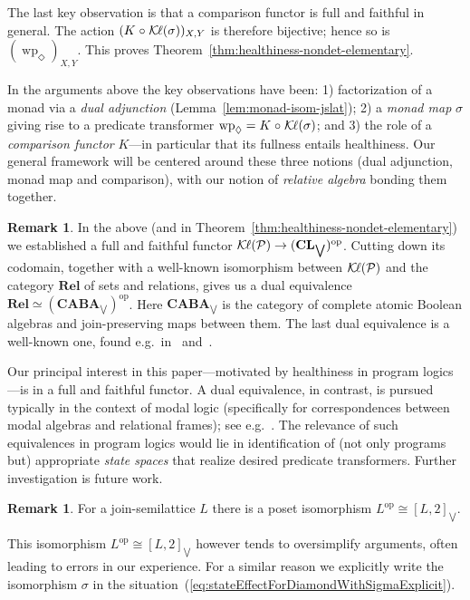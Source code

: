 \documentclass[9pt, preprint]{sigplanconf}
\theoremstyle{theorem}
\theoremstyle{definition}
\newtheorem{remark}[theorem]{Remark}
\newcommand{\pow}{\mathcal{P}}
\newcommand{\place}{{-}}
\newcommand{\op}{\mathrm{op}}
\newcommand{\Rel}{\mathbf{Rel}}
\newcommand{\CL}{\mathbf{CL}}
\newcommand{\Kl}{\mathcal{K}{\kern-.2ex}\ell}
\newcommand{\biglor}{\bigvee}
\newif\ifignore \ignorefalse
\newcommand{\auxproof}[1]{
\ifignore\mbox{}\newline
\textbf{BEGIN: AUX-PROOF} \dotfill\newline
{#1}\mbox{}\newline
\textbf{END: AUX-PROOF}\dotfill\newline
\fi}
\newcommand{\co}{\mathrel{\circ}}
\newcommand{\wpre}{\mathop{\mathrm{wp}}\nolimits}
\begin{document}
The last key observation is that
 a comparison functor is full and faithful
in general.   The action $(K\co \Kl(\sigma))_{X,Y}$ is therefore bijective;
 hence so is $(\wpre_{\Diamond})_{X,Y}$.
This proves Theorem~\ref{thm:healthiness-nondet-elementary}.


In the arguments above the key observations have been: 1) factorization of
a monad via a \emph{dual adjunction} (Lemma~\ref{lem:monad-isom-jslat});
2) a \emph{monad map} $\sigma$ giving rise to a predicate transformer
$\wpre_{\Diamond}=K\co\Kl(\sigma)$; and 3) the role of a \emph{comparison
functor} $K$---in particular that its fullness entails healthiness.
Our general framework will be centered around these three notions (dual
adjunction, monad map and comparison), with our notion of \emph{relative
algebra} bonding them together.


\begin{remark}\label{rem:CABA}
In the above (and in Theorem~\ref{thm:healthiness-nondet-elementary}) we
 established a full and faithful functor $\Kl(\pow)\to
 (\CL_{\biglor})^{\op}$.  Cutting down its codomain, together with a
 well-known isomorphism between $\Kl(\pow)$ and the category $\Rel$ of
 sets and relations, gives us a dual equivalence $\Rel\simeq
 (\mathbf{CABA}_{\biglor})^{\op}$. Here $\mathbf{CABA}_{\biglor}$ is the
 category of complete atomic Boolean algebras and join-preserving maps
 between them. The last dual equivalence is a well-known one, found
 e.g.\ in~\cite[Section~II.9]{Halmos06} and~\cite{JonssonT51}.

 Our principal interest in this paper---motivated by healthiness in
 program logics---is in a full and faithful functor. A dual equivalence,
 in contrast, is pursued typically in the context of modal logic
 (specifically for correspondences between modal algebras and relational
 frames); see e.g.~\cite{HofmannN15}. The relevance of such equivalences
 in program logics would lie in identification of (not only programs
 but) appropriate \emph{state spaces} that realize desired predicate
 transformers. Further investigation is future work.
\end{remark}

\begin{remark}\label{rem:pitfalls}
  For a join-semilattice $L$ there is a poset isomorphism
  $L^{\op} \cong [L, 2]_{\biglor}$.
\auxproof{ Here $L^{\op}$ is the poset obtained
   from $L$ by reversing the order; and
the isomorphism
is  given concretely  by
\ldotp y \not\leq x)$ (where $0\in 2$ is for false and $1\in 2$ is
   for true).  The adjunction~(\ref{eq:set-jslat-dualadj}) can also be
   stated using this isomorphism, in which case the isomorphism
   between $\pow$ and $[2^{(\place)}, 2]_{\biglor}$ becomes obvious.
}  This isomorphism $L^{\op} \cong [L, 2]_{\biglor}$ however tends to
oversimplify arguments, often leading to errors in our experience.
For a similar reason we explicitly write the isomorphism $\sigma$ in the
situation~(\ref{eq:stateEffectForDiamondWithSigmaExplicit}).
\end{remark}
\end{document}
